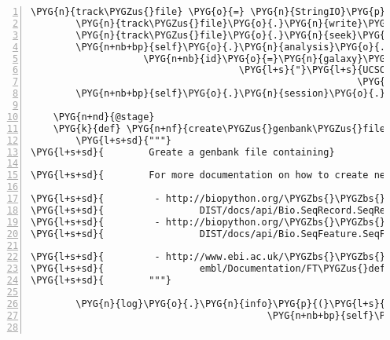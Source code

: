 \begin{Verbatim}[commandchars=\\\{\},numbers=left,firstnumber=1,stepnumber=5]
        \PYG{n}{track\PYGZus{}file} \PYG{o}{=} \PYG{n}{StringIO}\PYG{p}{(}\PYG{p}{)}
        \PYG{n}{track\PYGZus{}file}\PYG{o}{.}\PYG{n}{write}\PYG{p}{(}\PYG{l+s}{'}\PYG{l+s+se}{\PYGZbs{}n}\PYG{l+s}{'}\PYG{o}{.}\PYG{n}{join}\PYG{p}{(}\PYG{n}{tracks}\PYG{p}{)}\PYG{p}{)}
        \PYG{n}{track\PYGZus{}file}\PYG{o}{.}\PYG{n}{seek}\PYG{p}{(}\PYG{l+m+mi}{0}\PYG{p}{)}
        \PYG{n+nb+bp}{self}\PYG{o}{.}\PYG{n}{analysis}\PYG{o}{.}\PYG{n}{galaxy\PYGZus{}hg\PYGZus{}text} \PYG{o}{=} \PYG{n}{GalaxyDataset}\PYG{p}{(}
                    \PYG{n+nb}{id}\PYG{o}{=}\PYG{n}{galaxy}\PYG{o}{.}\PYG{n}{upload}\PYG{p}{(}\PYG{n}{track\PYGZus{}file}\PYG{p}{,}
                                     \PYG{l+s}{"}\PYG{l+s}{UCSC Tracks Analysis}\PYG{l+s+si}{\PYGZpc{}d}\PYG{l+s}{.txt}\PYG{l+s}{"} \PYG{o}{\PYGZpc{}}
                                                          \PYG{n+nb+bp}{self}\PYG{o}{.}\PYG{n}{analysis}\PYG{o}{.}\PYG{n}{id}\PYG{p}{)}\PYG{p}{)}
        \PYG{n+nb+bp}{self}\PYG{o}{.}\PYG{n}{session}\PYG{o}{.}\PYG{n}{commit}\PYG{p}{(}\PYG{p}{)}

    \PYG{n+nd}{@stage}
    \PYG{k}{def} \PYG{n+nf}{create\PYGZus{}genbank\PYGZus{}file}\PYG{p}{(}\PYG{n+nb+bp}{self}\PYG{p}{)}\PYG{p}{:}
        \PYG{l+s+sd}{"""}
\PYG{l+s+sd}{        Greate a genbank file containing}

\PYG{l+s+sd}{        For more documentation on how to create new features, visit}

\PYG{l+s+sd}{         - http://biopython.org/\PYGZbs{}\PYGZbs{}}
\PYG{l+s+sd}{                 DIST/docs/api/Bio.SeqRecord.SeqRecord-class.html\PYGZsh{}\PYGZus{}\PYGZus{}getitem\PYGZus{}\PYGZus{}}
\PYG{l+s+sd}{         - http://biopython.org/\PYGZbs{}\PYGZbs{}}
\PYG{l+s+sd}{                 DIST/docs/api/Bio.SeqFeature.SeqFeature-class.html}

\PYG{l+s+sd}{         - http://www.ebi.ac.uk/\PYGZbs{}\PYGZbs{}}
\PYG{l+s+sd}{                 embl/Documentation/FT\PYGZus{}definitions/feature\PYGZus{}table.html}
\PYG{l+s+sd}{        """}

        \PYG{n}{log}\PYG{o}{.}\PYG{n}{info}\PYG{p}{(}\PYG{l+s}{"}\PYG{l+s}{augmenting genbank file }\PYG{l+s+si}{\PYGZpc{}s}\PYG{l+s}{ with putative operons}\PYG{l+s}{"} \PYG{o}{\PYGZpc{}}
                                          \PYG{n+nb+bp}{self}\PYG{o}{.}\PYG{n}{analysis}\PYG{o}{.}\PYG{n}{genbankfile\PYGZus{}name}\PYG{p}{)}


\end{Verbatim}
